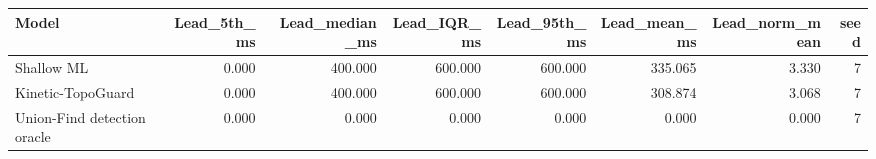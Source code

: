 \begin{tabular}{lrrrrrrr}
\toprule
Model & Lead\_5th\_ms & Lead\_median\_ms & Lead\_IQR\_ms & Lead\_95th\_ms & Lead\_mean\_ms & Lead\_norm\_mean & seed \\
\midrule
Shallow ML & 0.000 & 400.000 & 600.000 & 600.000 & 335.065 & 3.330 & 7 \\
Kinetic-TopoGuard & 0.000 & 400.000 & 600.000 & 600.000 & 308.874 & 3.068 & 7 \\
Union-Find detection oracle & 0.000 & 0.000 & 0.000 & 0.000 & 0.000 & 0.000 & 7 \\
\bottomrule
\end{tabular}